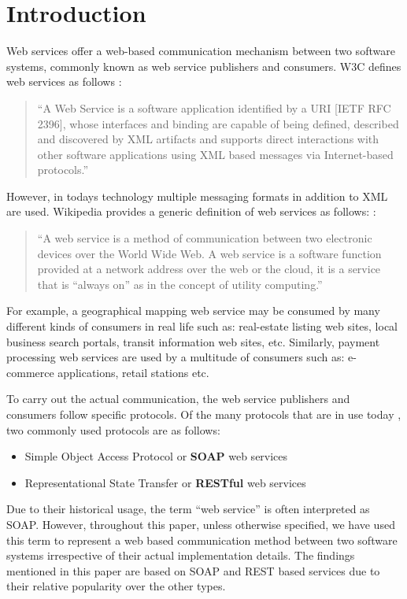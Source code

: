 \documentclass[runningheads,a4paper]{llncs}
\begin{document}
\section{Introduction}

Web services offer a web-based communication mechanism between two software systems, commonly known as web service publishers and consumers. W3C defines web services as follows \cite{w3c_web_service}:

\begin{quote}
``A Web Service is a software application identified by a URI [IETF RFC 2396], whose interfaces and binding are capable of being defined, described and discovered by XML artifacts and supports direct interactions with other software applications using XML based messages via Internet-based protocols.''
\end{quote}

However, in todays technology multiple messaging formats in addition to XML are used. Wikipedia provides a generic definition of web services as follows: \cite{web_service_wiki}:

\begin{quote}
``A web service is a method of communication between two electronic devices over the World Wide Web. A web service is a software function provided at a network address over the web or the cloud, it is a service that is ``always on'' as in the concept of utility computing.''
\end{quote}

For example, a geographical mapping web service may be consumed by many different kinds of consumers in real life such as: real-estate listing web sites, local business search portals, transit information web sites, etc. Similarly, payment processing web services are used by a multitude of consumers such as: e-commerce applications, retail stations etc.

To carry out the actual communication, the web service publishers and consumers follow specific protocols. Of the many protocols that are in use today \cite{web_service_protocols_wiki}, two commonly used protocols are as follows:

\begin{itemize}
  \item Simple Object Access Protocol or \textbf{SOAP} web services
  \item Representational State Transfer or \textbf{RESTful} web services
\end{itemize}

Due to their historical usage, the term ``web service'' is often interpreted as SOAP. However, throughout this paper, unless otherwise specified, we have used this term to represent a web based communication method between two software systems irrespective of their actual implementation details. The findings mentioned in this paper are based on SOAP and REST based services due to their relative popularity over the other types.
\end{document}
